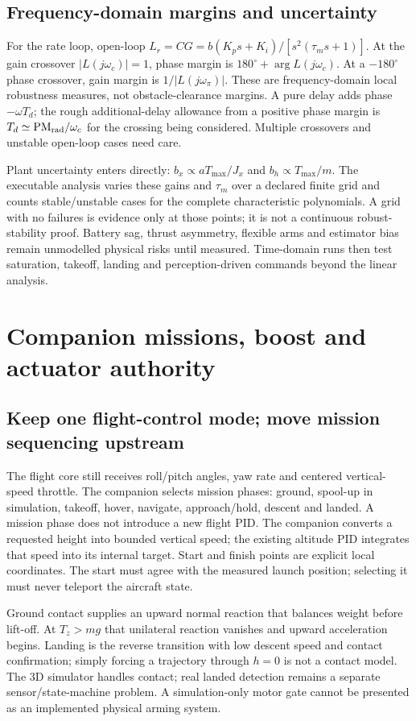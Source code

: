 \section{Frequency-domain margins and uncertainty}
For the rate loop, open-loop $L_r=C G=b(K_ps+K_i)/[s^2(\tau_ms+1)]$.
At the gain crossover $|L(j\omega_c)|=1$, phase margin is
$180^\circ+\arg L(j\omega_c)$. At a $-180^\circ$ phase crossover,
gain margin is $1/|L(j\omega_\pi)|$. These are frequency-domain local robustness
measures, not obstacle-clearance margins. A pure delay adds phase
$-\omega T_d$; the rough additional-delay allowance from a positive phase
margin is $T_d\simeq\mathrm{PM}_{\rm rad}/\omega_c$ for the crossing being
considered. Multiple crossovers and unstable open-loop cases need care.

Plant uncertainty enters directly: $b_x\propto aT_{\max}/J_x$ and
$b_h\propto T_{\max}/m$. The executable analysis varies these gains and
$\tau_m$ over a declared finite grid and counts stable/unstable cases for the
complete characteristic polynomials. A grid with no failures is evidence
only at those points; it is not a continuous robust-stability proof. Battery
sag, thrust asymmetry, flexible arms and estimator bias remain unmodelled
physical risks until measured. Time-domain runs then test saturation, takeoff,
landing and perception-driven commands beyond the linear analysis.

\chapter{Companion missions, boost and actuator authority}
\section{Keep one flight-control mode; move mission sequencing upstream}
The flight core still receives roll/pitch angles, yaw rate and centered
vertical-speed throttle. The companion selects mission phases: ground,
spool-up in simulation, takeoff, hover, navigate, approach/hold, descent and
landed. A mission phase does not introduce a new flight PID. The companion
converts a requested height into bounded vertical speed; the existing altitude
PID integrates that speed into its internal target. Start and finish points
are explicit local coordinates. The start must agree with the measured launch
position; selecting it must never teleport the aircraft state.

Ground contact supplies an upward normal reaction that balances weight before
lift-off. At $T_z>mg$ that unilateral reaction vanishes and upward acceleration
begins. Landing is the reverse transition with low descent speed and contact
confirmation; simply forcing a trajectory through $h=0$ is not a contact model.
The 3D simulator handles contact; real landed detection remains a separate
sensor/state-machine problem. A simulation-only motor gate cannot be presented
as an implemented physical arming system.

